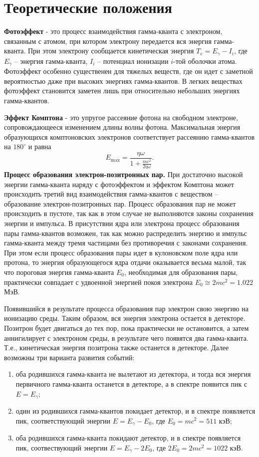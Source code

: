 \documentclass[a4paper]{article}
\begin{document}
\section{Теоретические положения}
\textbf{Фотоэффект} - это процесс взаимодействия гамма-кванта с электроном, связанным с атомом, при котором электрону передается вся энергия гамма-кванта. При этом электрону сообщается кинетическая энергия $T_e=E_\gamma-I_i$, где $E_\gamma$ -- энергия гамма-кванта, $I_i$ -- потенциал ионизации $i$-той оболочки атома. Фотоэффект особенно существенен для тяжелых веществ, где он идет с заметной вероятностью даже при высоких энергиях гамма-квантов. В легких веществах фотоэффект становится заметен лишь при относительно небольших энергиях гамма-квантов.  \par
\textbf{Эффект Комптона} - это упругое рассеяние фотона на свободном электроне, сопровождающееся изменением длины волны фотона. Максимальная энергия образующихся комптоновских электронов соответствует рассеянию гамма-квантов на $180^\circ$ и равна
\begin{equation}
E_{\max}=\frac{\eta\omega}{1+\frac{mc^2}{2\eta\omega}}.
\end{equation}
\textbf{Процесс образования электрон-позитронных пар.}
При достаточно высокой энергии гамма-кванта наряду с фотоэффектом и эффектом Комптона может происходить третий вид взаимодействия гамма-квантов с веществом -- образование электрон-позитронных пар. Процесс образования пар не может происходить в пустоте, так как в этом случае не выполняются законы сохранения энергии и импульса. В присутствии ядра или электрона процесс образования пары гамма-квантов возможен, так как можно распределить энергию и импульс гамма-кванта между тремя частицами без противоречия с законами сохранения. При этом если процесс образования пары идет в кулоновском поле ядра или протона, то энергия образующегося ядра отдачи оказывается весьма малой, так что пороговая энергия гамма-кванта $E_0$, необходимая для образования пары, практически совпадает с удвоенной энергией покоя электрона $E_0\cong 2mc^2=1.022$ МэВ.\par
Появившийся в результате процесса образования пар электрон свою энергию на ионизацию среды. Таким образом, вся энергия электрона остается в детекторе. Позитрон будет двигаться до тех пор, пока практически не остановится, а затем аннигилирует с электроном среды, в результате чего появятся два гамма-кванта. Т.е., кинетическая энергия позитрона также останется в детекторе. Далее возможны три варианта развития событий:
\begin{enumerate}
\item оба родившихся гамма-кванта не вылетают из детектора, и тогда вся энергия первичного гамма-кванта останется в детекторе, а в спектре появится пик с $E=E_{\gamma}$;
\item один из родившихся гамма-квантов покидает детектор, и в спектре появляется пик, соответствующий энергии $E=E_{\gamma}-E_0$, где $E_0=mc^2=511$ кэВ;
\item оба родившихся гамма-кванта покидают детектор, и в спектре появляется пик, соотвествующий энергии $E=E_{\gamma}-2E_0$, где $2E_0=2mc^2=1022$ кэВ.
\end{enumerate}
\end{document}
